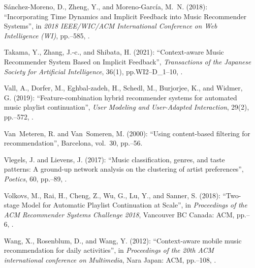 \documentclass[11pt,titlepage,oneside]{book}
\begin{document}
\begin{thebibliography}{97}
	Sánchez-Moreno, D., Zheng, Y., and Moreno-García, M.~N. (2018):
	\enquote{Incorporating {Time} {Dynamics} and {Implicit} {Feedback} into
		{Music} {Recommender} {Systems}}, in \textit{2018 {IEEE}/{WIC}/{ACM}
		{International} {Conference} on {Web} {Intelligence} ({WI})},
	pp.--585, .
	
	Takama, Y., Zhang, J.-c., and Shibata, H. (2021): \enquote{Context-aware
		{Music} {Recommender} {System} {Based} on {Implicit} {Feedback}},
	\textit{Transactions of the Japanese Society for Artificial Intelligence},
	36(1), pp.\ignorespaces WI2--D\_1--10, .
	
	Vall, A., Dorfer, M., Eghbal-zadeh, H., Schedl, M., Burjorjee, K., and Widmer,
	G. (2019): \enquote{Feature-combination hybrid recommender systems for
		automated music playlist continuation}, \textit{User Modeling and
		User-Adapted Interaction}, 29(2), pp.--572,
	.
	
	Van~Meteren, R. and Van~Someren, M. (2000): \enquote{Using content-based
		filtering for recommendation}, Barcelona, vol.~30, pp.--56.
	
	Vlegels, J. and Lievens, J. (2017): \enquote{Music classification, genres, and
		taste patterns: {A} ground-up network analysis on the clustering of artist
		preferences}, \textit{Poetics}, 60, pp.--89,
	.
	
	Volkovs, M., Rai, H., Cheng, Z., Wu, G., Lu, Y., and Sanner, S. (2018):
	\enquote{Two-stage {Model} for {Automatic} {Playlist} {Continuation} at
		{Scale}}, in \textit{Proceedings of the {ACM} {Recommender} {Systems}
		{Challenge} 2018}, Vancouver BC Canada: ACM, pp.--6,
	.
	
	Wang, X., Rosenblum, D., and Wang, Y. (2012): \enquote{Context-aware mobile
		music recommendation for daily activities}, in \textit{Proceedings of the
		20th {ACM} international conference on {Multimedia}}, Nara Japan: ACM,
	pp.--108, .
	

\end{thebibliography}
\end{document}
